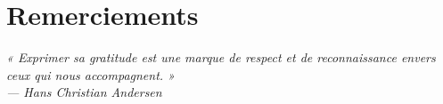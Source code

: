 \chapter*{Remerciements}
\thispagestyle{empty}


\vspace*{0.5cm}

\begin{center}
    \begin{tcolorbox}[
        colback=lightBlue,
        colframe=tekupBlue,
        boxrule=0.8pt,
        arc=6pt,
        width=0.78\linewidth,
        halign=center
    ]
        \itshape\large
        « Exprimer sa gratitude est une marque de respect et de reconnaissance envers ceux qui nous accompagnent. »\\[4pt]
        {\normalsize\normalfont\color{gray}— Hans Christian Andersen}
    \end{tcolorbox}
\end{center}

\vspace{0.8cm}

